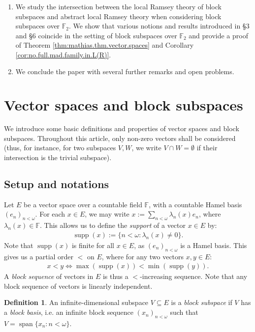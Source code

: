 \documentclass[11pt,reqno]{amsart}
\theoremstyle{plain}
\numberwithin{equation}{section}
\theoremstyle{definition}
\newtheorem{definition}[theorem]{Definition}
\newcommand{\func}{\operatorname}
\newcommand{\supp}{\func{supp}}
\let\Sec\S
\renewcommand{\S}{\mathcal{S}}
\begin{document}
\begin{enumerate}
    \item[(\Sec\ref{sec:TRS.block.subspaces})] We study the intersection between the local Ramsey theory of block subspaces and abstract local Ramsey theory when considering block subspaces over $\mathbb{F}_2$. We show that various notions and results introduced in \Sec3 and \Sec6 coincide in the setting of block subspaces over $\mathbb{F}_2$ and provide a proof of Theorem \ref{thm:mathias.thm.vector.spaces} and Corollary \ref{cor:no.full.mad.family.in.L(R)}.
    
    \item[(\Sec\ref{sec:conclusion})] We conclude the paper with several further remarks and open problems.
\end{enumerate}

\section{Vector spaces and block subspaces}
\label{sec:setup}
We introduce some basic definitions and properties of vector spaces and block subspaces. Throughout this article, only non-zero vectors shall be considered (thus, for instance, for two subspaces $V,W$, we write $V \cap W = \emptyset$ if their intersection is the trivial subspace).

\subsection{Setup and notations}
Let $E$ be a vector space over a countable field $\mathbb{F}$, with a countable Hamel basis $(e_n)_{n<\omega}$. For each $x \in E$, we may write $x := \sum_{n<\omega} \lambda_n(x)e_n$, where $\lambda_n(x) \in \mathbb{F}$. This allows us to define the \emph{support} of a vector $x \in E$ by:
\begin{align*}
    \supp(x) := \{n < \omega : \lambda_n(x) \neq 0\}.
\end{align*}
Note that $\supp(x)$ is finite for all $x \in E$, as $(e_n)_{n<\omega}$ is a Hamel basis. This gives us a partial order $<$ on $E$, where for any two vectors $x,y \in E$:
\begin{align*}
    x < y \iff \max(\supp(x)) < \min(\supp(y)).
\end{align*}
A \emph{block sequence} of vectors in $E$ is thus a $<$-increasing sequence. Note that any block sequence of vectors is linearly independent. 

\begin{definition}
    An infinite-dimensional subspace $V \subseteq E$ is a \emph{block subspace} if $V$ has a \emph{block basis}, i.e. an infinite block sequence $(x_n)_{n<\omega}$ such that $V = \func{span}\{x_n : n < \omega\}$.
\end{definition}
\end{document}
